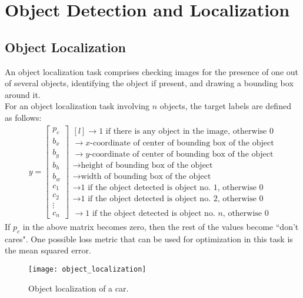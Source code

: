 \documentclass[a4paper, 12pt]{report}
\begin{document}
\chapter{Object Detection and Localization}

\section{Object Localization}
An object localization task comprises checking images for the presence of one out of several objects, identifying the object if present, and drawing a bounding box around it.\\
\break
For an object localization task involving $n$ objects, the target labels are defined as follows:
\begin{align*}
y=
\begin{bmatrix}
p_c\\b_x\\b_y\\b_h\\b_w\\c_1\\c_2\\\vdots\\c_n
\end{bmatrix}
\begin{matrix*}[l]
\rightarrow\text{1 if there is any object in the image, otherwise 0}\\
\rightarrow\text{$x$-coordinate of center of bounding box of the object}\\
\rightarrow\text{$y$-coordinate of center of bounding box of the object}\\
\rightarrow\text{height of bounding box of the object}\\
\rightarrow\text{width of bounding box of the object}\\
\rightarrow\text{1 if the object detected is object no. 1, otherwise 0}\\
\rightarrow\text{1 if the object detected is object no. 2, otherwise 0}\\
\\
\rightarrow\text{1 if the object detected is object no. $n$, otherwise 0}
\end{matrix*}
\end{align*}
If $p_c$ in the above matrix becomes zero, then the rest of the values become ``don't cares". One possible loss metric that can be used for optimization in this task is the mean squared error.
\begin{figure}[H]
\centering
\texttt{[image: object\_localization]}
\caption{Object localization of a car.}
\end{figure}
\end{document}
